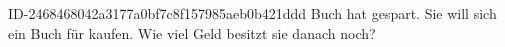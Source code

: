 \begin{exercise}
      {ID-2468468042a3177a0bf7c8f157985aeb0b421ddd}
      {Buch}
  \ifproblem\problem
    \xxb{} hat  gespart. Sie will sich ein Buch für  kaufen.
    Wie viel Geld besitzt sie danach noch?
  \fi
\end{exercise}
